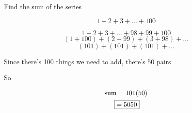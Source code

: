 \documentclass[../../Main.tex]{subfiles}
\begin{document}
\begin{example}
    Find the sum of the series

    \item 
    {
        \[ 1 + 2 + 3 + \ldots + 100 \]

        \begin{solution}
            \[ 1 + 2 + 3 + \ldots + 98 + 99 + 100 \]
            \[ (1 + 100) + (2 + 99) + (3 + 98) + \ldots \]
            \[ (101) + (101) + (101) + \ldots \]

            Since there's 100 things we need to add, there's 50 pairs

            So 

            \begin{align*}
                \text{sum} &= 101(50) \\
                \Aboxed{ &= 5050 } \\
            \end{align*}
        \end{solution}
    }
\end{example}
\end{document}
